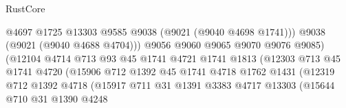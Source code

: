 \begin{lexlean}{RustCore}
\begin{coremodule}
                                            @4697
                                            @1725
                                            @13303
                                            @9585
                                            @9038
                                            (@9021 (@9040 @4698 @1741)))
                                          @9038
                                          (@9021 (@9040 @4688 @4704)))
                                        @9056
                                        @9060
                                        @9065
                                        @9070
                                        @9076
                                        @9085)
                                      (@12104
                                        @4714
                                        @713
                                        @93
                                        @45
                                        @1741
                                        @4721
                                        @1741
                                        @1813
                                        (@12303
                                          @713
                                          @45
                                          @1741
                                          @4720
                                          (@15906
                                            @712
                                            @1392
                                            @45
                                            @1741
                                            @4718
                                            @1762
                                            @1431
                                            (@12319
                                              @712
                                              @1392
                                              @4718
                                              (@15917
                                                @711
                                                @31
                                                @1391
                                                @3383
                                                @4717
                                                @13303
                                                (@15644
                                                  @710
                                                  @31
                                                  @1390
                                                  @4248

\end{coremodule}
\end{lexlean}
